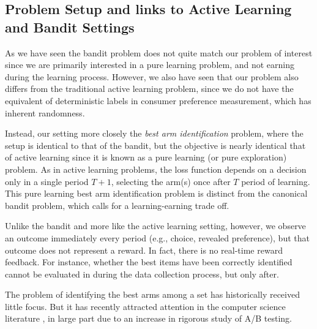\documentclass[blindrev]{informs3} %
\begin{document}
\subsection{Problem Setup and links to Active Learning and Bandit Settings}

As we have seen the bandit problem does not quite match our problem of interest since we are primarily interested in a pure learning problem, and not earning during the learning process. However, we also have seen that our problem also differs from the traditional active learning problem, since we do not have the equivalent of deterministic labels in consumer preference measurement, which has inherent randomness. 

Instead, our setting more closely the \emph{best arm identification} problem, where the setup is identical to that of the bandit, but the objective is nearly identical that of active learning since it is known as a pure learning (or pure exploration) problem. As in active learning problems, the loss function depends on a decision only in a single period $T+1$, selecting the arm(s) once after $T$ period of learning. This pure learning best arm identification problem is distinct from the canonical bandit problem, which calls for a learning-earning trade off. 

Unlike the bandit and more like the active learning setting, however, we observe an outcome immediately every period (e.g., choice, revealed preference), but that outcome does not represent a reward. In fact, there is no real-time reward feedback. For instance, whether the best items have been correctly identified cannot be evaluated in during the data collection process, but only after.

The problem of identifying the best arms among a set has historically received little focus. But it has recently attracted attention in the computer science literature \citep{gabillon2012best,jamieson2014lil,kalyanakrishnan2012pac,kaufmann2016complexity,kaufmann2013information,russo2018simple}, in large part due to an increase in rigorous study of A/B testing. 

\end{document}
